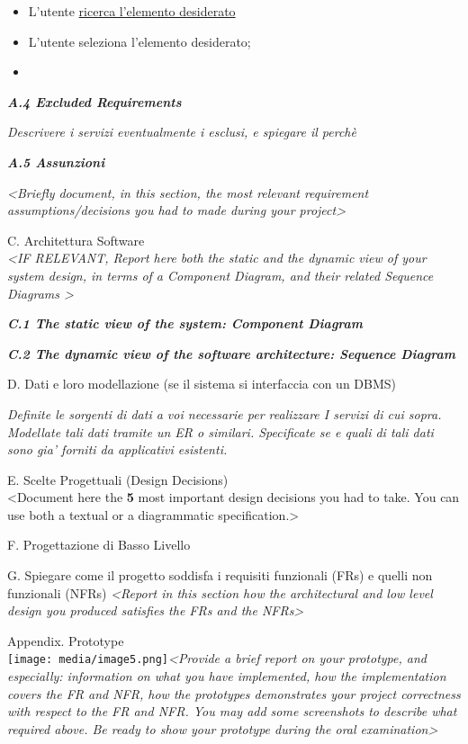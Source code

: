 \begin{itemize}
\item
  L'utente \ul{ricerca l'elemento desiderato}
\item
  L'utente seleziona l'elemento desiderato;
\item
\end{itemize}

\emph{\textbf{A.4 Excluded Requirements}}

\emph{Descrivere i servizi eventualmente i esclusi, e spiegare il
perchè}

\emph{\textbf{A.5 Assunzioni}}

\emph{\textless Briefly document, in this section, the most relevant
requirement assumptions/decisions you had to made during your
project\textgreater{}}

C. Architettura Software\\
\emph{\textless IF RELEVANT, Report here both the static and the dynamic
view of your system design, in terms of a Component Diagram, and their
related Sequence Diagrams \textgreater{}}

\emph{\textbf{C.1 The static view of the system: Component Diagram}}

\emph{\textbf{C.2 The dynamic view of the software architecture:
Sequence Diagram}}

D. Dati e loro modellazione (se il sistema si interfaccia con un DBMS)

\emph{Definite le sorgenti di dati a voi necessarie per realizzare I
servizi di cui sopra. Modellate tali dati tramite un ER o similari.
Specificate se e quali di tali dati sono gia' forniti da applicativi
esistenti.}

E. Scelte Progettuali (Design Decisions)\\
\textless Document here the \textbf{5} most important design decisions
you had to take. You can use both a textual or a diagrammatic
specification.\textgreater{}

F. Progettazione di Basso Livello

G. Spiegare come il progetto soddisfa i requisiti funzionali (FRs) e
quelli non funzionali (NFRs) \emph{\textless Report in this section how
the architectural and low level design you produced satisfies the FRs
and the NFRs\textgreater{}}

Appendix. Prototype\\
\texttt{[image: media/image5.png]}\emph{\textless Provide
a brief report on your prototype, and especially: information on what
you have implemented, how the implementation covers the FR and NFR, how
the prototypes demonstrates your project correctness with respect to the
FR and NFR. You may add some screenshots to describe what required
above. Be ready to show your prototype during the oral
examination\textgreater{}}
